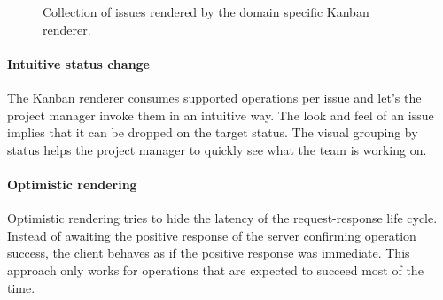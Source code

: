 \begin{figure}[!htb]
  \caption{Collection of issues rendered by the domain specific Kanban renderer.}
  \label{fig:kanban}
\end{figure}

\paragraph{Intuitive status change}
The Kanban renderer consumes supported operations per issue and let's the project manager invoke them in an intuitive way. The look and feel of an issue implies that it can be dropped on the target status. The visual grouping by status helps the project manager to quickly see what the team is working on.

\paragraph{Optimistic rendering}
Optimistic rendering tries to hide the latency of the request-response life cycle. Instead of awaiting the positive response of the server confirming operation success, the client behaves as if the positive response was immediate. This approach only works for operations that are expected to succeed most of the time.

